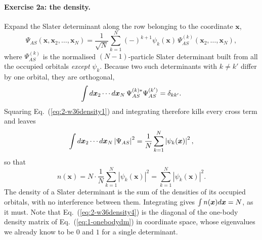 \paragraph{Exercise 2a: the density.}
Expand the Slater determinant along the row belonging to the coordinate
$\bm{x}$,
\begin{equation}
  \Psi_{AS}(\bm{x},\bm{x}_2,\dots,\bm{x}_N)
   = \frac{1}{\sqrt{N}}\sum_{k=1}^{N}(-)^{k+1}\psi_{k}(\bm{x})\,
     \Psi^{(k)}_{AS}(\bm{x}_2,\dots,\bm{x}_N),
  \label{eq:2-w36density1}
\end{equation}
where $\Psi^{(k)}_{AS}$ is the normalised $(N-1)$-particle Slater determinant
built from all the occupied orbitals \emph{except} $\psi_k$.  Because two such
determinants with $k\ne k'$ differ by one orbital, they are orthogonal,
\begin{equation}
  \int d\bm{x}_2\cdots d\bm{x}_N\,
   \Psi^{(k)*}_{AS}\Psi^{(k')}_{AS} = \delta_{kk'} .
  \label{eq:2-w36density2}
\end{equation}
Squaring Eq.~(\ref{eq:2-w36density1}) and integrating therefore kills every
cross term and leaves
\begin{equation}
  \int d\bm{x}_2\cdots d\bm{x}_N\left|\Psi_{AS}\right|^2
   = \frac{1}{N}\sum_{k=1}^{N}\left|\psi_k(\bm{x})\right|^2 ,
  \label{eq:2-w36density3}
\end{equation}
so that
\begin{equation}
  n(\bm{x}) = N\cdot\frac{1}{N}\sum_{k=1}^{N}\left|\psi_k(\bm{x})\right|^2
            = \sum_{k=1}^{N}\left|\psi_k(\bm{x})\right|^2 .
  \label{eq:2-w36density4}
\end{equation}
The density of a Slater determinant is the sum of the densities of its
occupied orbitals, with no interference between them.  Integrating gives
$\int n(\bm{x})d\bm{x}=N$, as it must.  Note that
Eq.~(\ref{eq:2-w36density4}) is the diagonal of the one-body density matrix
of Eq.~(\ref{eq:1-onebodydm}) in coordinate space, whose eigenvalues we
already know to be $0$ and $1$ for a single determinant.

